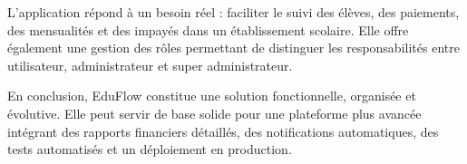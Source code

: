 \documentclass[12pt,a4paper]{report}
\begin{document}
L'application répond à un besoin réel : faciliter le suivi des élèves, des paiements, des mensualités et des impayés dans un établissement scolaire. Elle offre également une gestion des rôles permettant de distinguer les responsabilités entre utilisateur, administrateur et super administrateur.

En conclusion, EduFlow constitue une solution fonctionnelle, organisée et évolutive. Elle peut servir de base solide pour une plateforme plus avancée intégrant des rapports financiers détaillés, des notifications automatiques, des tests automatisés et un déploiement en production.
\end{document}
